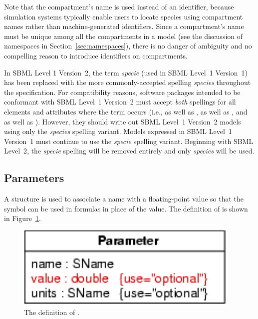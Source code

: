 \documentclass[10pt]{cekarticle}
\newcommand{\vref}[1]{\ref{#1}}
\newcommand{\changed}[1]{\textcolor{BrickRed}{#1}}
\newenvironment{blockChanged}{\color{BrickRed}}{}
\begin{document}
Note that the compartment's name is used instead of an identifier, because
simulation systems typically enable users to locate species using
compartment names rather than machine-generated identifiers.  Since a
compartment's name must be unique among all the compartments in a model
(see the discussion of namespaces in Section~\ref{sec:namespaces}), there
is no danger of ambiguity and no compelling reason to introduce identifiers
on compartments.

\begin{blockChanged}
  In SBML Level 1 Version~2, the term \emph{specie} (used in SBML Level~1
  Version~1) has been replaced with the more commonly-accepted spelling
  \emph{species} throughout the specification.  For compatibility reasons,
  software packages intended to be conformant with SBML Level~1 Version~2
  must accept \emph{both} spellings for all elements and attributes where
  the term occurs (i.e.,  as well as ,
   as well as , and
   as well as
  ).  However, they should write out SBML
  Level~1 Version~2 models using only the \emph{species} spelling variant.
  Models expressed in SBML Level~1 Version~1 must continue to use the
  \emph{specie} spelling variant.  Beginning with SBML Level~2, the
  \emph{specie} spelling will be removed entirely and only \emph{species}
  will be used.
\end{blockChanged}


\subsection{Parameters}
\label{sec:parameters}

A  structure is used to associate a \changed{name} with a
floating-point value so that the symbol can be used in formulas in place of
the value.  The definition of  is shown in
Figure~\vref{fig:parameter}.

\begin{figure}[htb]
  \centering
  \includegraphics[scale = 0.68]{parameter}
  \caption{The definition of .}
  \label{fig:parameter}
\end{figure}
\end{document}
